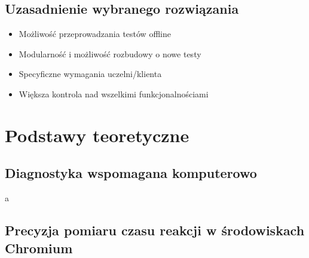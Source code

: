 \documentclass[12pt, a4paper, oneside]{report}
\begin{document}
\section{Uzasadnienie wybranego rozwiązania}
\label{sec:uzasadnienie}

 \begin{itemize}
     \item Możliwość przeprowadzania testów offline
     \item Modularność i możliwość rozbudowy o nowe testy
     \item Specyficzne wymagania uczelni/klienta
     \item Większa kontrola nad wszelkimi funkcjonalnościami
     
 \end{itemize}


\chapter{Podstawy teoretyczne}
\label{chap:teoria}


\section{Diagnostyka wspomagana komputerowo}a
\label{sec:diagnostyka}



\section{Precyzja pomiaru czasu reakcji w środowiskach Chromium}
\label{sec:precyzja}

\end{document}
